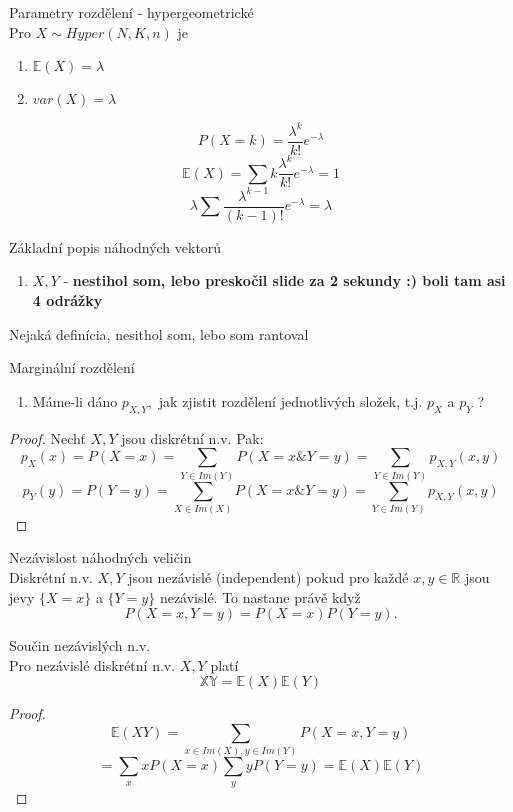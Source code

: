 \documentclass[../main.tex]{subfiles}
\begin{document}
\begin{theorem}
    Parametry rozdělení - hypergeometrické\\

    Pro $X\sim Hyper(N,K,n)$ je
    \begin{enumerate}
        \item $\mathbb{E}(X) = \lambda$
        \item $var(X) = \lambda$
    \end{enumerate}
    \[P(X=k) = \frac{\lambda^k}{k!}e^{-\lambda}\]
    \[\mathbb{E}(X) = \sum k \frac{\lambda^k}{k!}e^{-\lambda} = 1\]
    \[\lambda \sum \frac{\lambda^{k-1}}{(k-1)!}e^{-\lambda} = \lambda\]    
\end{theorem}

\begin{definition}
    Základní popis náhodných vektorů
    \begin{enumerate}
        \item $X,Y$ - \textbf{nestihol som, lebo preskočil slide za 2 sekundy :) boli tam asi 4 odrážky}
    \end{enumerate}
\end{definition}
\begin{definition}
    Nejaká definícia, nesithol som, lebo som rantoval
\end{definition}
\begin{definition}
    Marginální rozdělení
    \begin{enumerate}
        \item Máme-li dáno $p_{X,Y},$ jak zjistit rozdělení jednotlivých složek, t.j. $p_X$ a $p_Y$ ?
    \end{enumerate}
    \begin{proof}
        Nechť $X,Y$ jsou diskrétní n.v. Pak:
        \[p_X(x) = P(X=x) = \sum_{Y\in Im(Y)} P(X = x \& Y=y) = \sum_{Y\in Im(Y)} p_{X,Y}(x,y)\]
        \[p_Y(y) = P(Y=y) = \sum_{X\in Im(X)} P(X = x \& Y=y) = \sum_{Y\in Im(Y)} p_{X,Y}(x,y)\]
    \end{proof}
\end{definition}
\begin{definition}
    Nezávislost náhodných veličin\\

    Diskrétní n.v. $X,Y$ jsou nezávislé (independent) pokud pro každé $x,y \in \mathbb{R}$ jsou jevy 
    $\{X=x\}$ a $\{Y=y\}$ nezávislé. To nastane právě když
    \[P(X=x,Y=y) = P(X=x)P(Y=y).\]
\end{definition}
\begin{theorem}
    Součin nezávislých n.v.\\

    Pro nezávislé diskrétní n.v. $X,Y$ platí
    \[\mathbb{XY} = \mathbb{E}(X)\mathbb{E}(Y)\]
    \begin{proof}
        \[\mathbb{E}(XY) = \sum_{x\in Im(X), y \in Im(Y)} P(X=x, Y=y)\]
        \[= \sum_x x P(X=x) \sum_y yP(Y=y) = \mathbb{E}(X)\mathbb{E}(Y)\]
    \end{proof}
\end{theorem}
\end{document}
